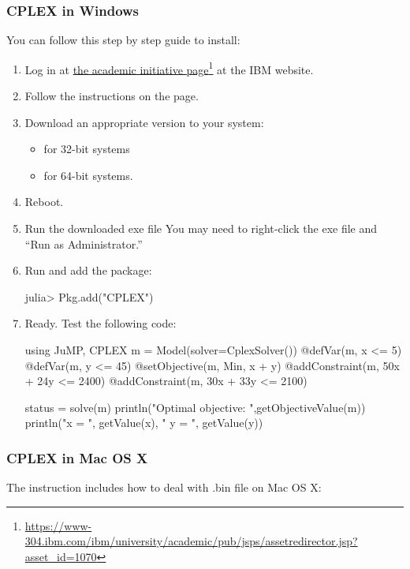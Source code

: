 \subsubsection{CPLEX in Windows}
You can follow this step by step guide to install:
\begin{enumerate}
\item Log in at \href{https://www-304.ibm.com/ibm/university/academic/pub/jsps/assetredirector.jsp?asset_id=1070}{the academic initiative page}\footnote{\url{https://www-304.ibm.com/ibm/university/academic/pub/jsps/assetredirector.jsp?asset_id=1070}} at the IBM website.
\item Follow the instructions on the page.
\item Download an appropriate version to your system:
    \begin{itemize}
        \item {} for 32-bit systems
        \item {} for 64-bit systems.
    \end{itemize}
\item Reboot.
\item Run the downloaded exe file You may need to right‐click the exe file and ``Run as Administrator.''
\item Run \julia{} and add the  package:
\begin{code}
julia> Pkg.add("CPLEX")
\end{code}

\item Ready. Test the following code:
\begin{code}
using JuMP, CPLEX
m = Model(solver=CplexSolver())
@defVar(m, x <= 5)
@defVar(m, y <= 45)
@setObjective(m, Min, x + y)
@addConstraint(m, 50x + 24y <= 2400)
@addConstraint(m, 30x + 33y <= 2100)

status = solve(m)
println("Optimal objective: ",getObjectiveValue(m))
println("x = ", getValue(x), " y = ", getValue(y))
\end{code}
\end{enumerate}


\subsubsection{CPLEX in Mac OS X}

The instruction includes how to deal with .bin file on Mac OS X:


